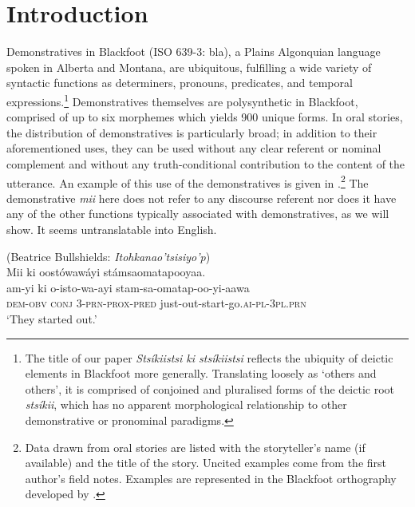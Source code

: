 \documentclass[output=paper,colorlinks,citecolor=brown]{langscibook}
\author{Heather Bliss\affiliation{Simon Fraser University}\orcid{}\lastand Martina Wiltschko\affiliation{Institució Catalana de Recerca i Estudis Avançats, Universitat Pompeu Fabra}\orcid{}}
\begin{document}
\maketitle
{}


\section{Introduction}\label{sec:bliss:1}

Demonstratives in Blackfoot (ISO 639-3: bla), a Plains Algonquian language spoken in Alberta and Montana, are ubiquitous, fulfilling a wide variety of syntactic functions as determiners, pronouns, predicates, and temporal expressions.\footnote{The title of our paper \textit{Stsíkiistsi ki stsíkiistsi} reflects the ubiquity of deictic elements in Blackfoot more generally. Translating loosely as ‘others and others’, it is comprised of conjoined and pluralised forms of the deictic root \textit{stsíkii}, which has no apparent morphological relationship to other demonstrative or pronominal paradigms.} Demonstratives themselves are polysynthetic in Blackfoot, comprised of up to six morphemes which yields 900 unique forms. In oral stories, the distribution of demonstratives is particularly broad; in addition to their aforementioned uses, they can be used without any clear referent or nominal complement and without any truth-conditional contribution to the content of the utterance. An example of this use of the demonstratives is given in .\footnote{Data drawn from oral stories are listed with the storyteller’s name (if available) and the title of the story. Uncited examples come from the first author’s field notes. Examples are represented in the Blackfoot orthography developed by \citet{Frantz1978}.} The demonstrative \textit{mii} here does not refer to any discourse referent nor does it have any of the other functions typically associated with demonstratives, as we will show. It seems untranslatable into English. 

\ea\label{ex:bliss:1} (Beatrice Bullshields: \textit{Itohkanao’tsisiyo’p})\\
{Mii ki oostówawáyi stámsaomatapooyaa.}\\
\gll am-yi ki o-isto-wa-ayi stam-sa-omatap-oo-yi-aawa\\
     \textsc{dem-obv} \textsc{conj} \textsc{3-prn-prox-pred} just-out-start-go.\textsc{ai-pl-3pl.prn}\\
     \glt ‘They started out.’
\z
\end{document}
